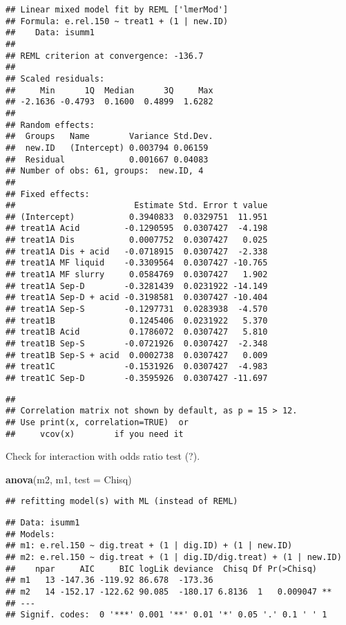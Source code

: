 \documentclass[
]{article}
\newenvironment{Shaded}{\begin{snugshade}}{\end{snugshade}}
\newcommand{\AttributeTok}[1]{\textcolor[rgb]{0.13,0.29,0.53}{#1}}
\newcommand{\FunctionTok}[1]{\textcolor[rgb]{0.13,0.29,0.53}{\textbf{#1}}}
\newcommand{\NormalTok}[1]{#1}
\newcommand{\StringTok}[1]{\textcolor[rgb]{0.31,0.60,0.02}{#1}}
\begin{document}
\begin{verbatim}
## Linear mixed model fit by REML ['lmerMod']
## Formula: e.rel.150 ~ treat1 + (1 | new.ID)
##    Data: isumm1
## 
## REML criterion at convergence: -136.7
## 
## Scaled residuals: 
##     Min      1Q  Median      3Q     Max 
## -2.1636 -0.4793  0.1600  0.4899  1.6282 
## 
## Random effects:
##  Groups   Name        Variance Std.Dev.
##  new.ID   (Intercept) 0.003794 0.06159 
##  Residual             0.001667 0.04083 
## Number of obs: 61, groups:  new.ID, 4
## 
## Fixed effects:
##                        Estimate Std. Error t value
## (Intercept)           0.3940833  0.0329751  11.951
## treat1A Acid         -0.1290595  0.0307427  -4.198
## treat1A Dis           0.0007752  0.0307427   0.025
## treat1A Dis + acid   -0.0718915  0.0307427  -2.338
## treat1A MF liquid    -0.3309564  0.0307427 -10.765
## treat1A MF slurry     0.0584769  0.0307427   1.902
## treat1A Sep-D        -0.3281439  0.0231922 -14.149
## treat1A Sep-D + acid -0.3198581  0.0307427 -10.404
## treat1A Sep-S        -0.1297731  0.0283938  -4.570
## treat1B               0.1245406  0.0231922   5.370
## treat1B Acid          0.1786072  0.0307427   5.810
## treat1B Sep-S        -0.0721926  0.0307427  -2.348
## treat1B Sep-S + acid  0.0002738  0.0307427   0.009
## treat1C              -0.1531926  0.0307427  -4.983
## treat1C Sep-D        -0.3595926  0.0307427 -11.697
\end{verbatim}

\begin{verbatim}
## 
## Correlation matrix not shown by default, as p = 15 > 12.
## Use print(x, correlation=TRUE)  or
##     vcov(x)        if you need it
\end{verbatim}

Check for interaction with odds ratio test (?).

\begin{Shaded}
\begin{Highlighting}[]
\FunctionTok{anova}\NormalTok{(m2, m1, }\AttributeTok{test =} \StringTok{\textquotesingle{}Chisq\textquotesingle{}}\NormalTok{)}
\end{Highlighting}
\end{Shaded}

\begin{verbatim}
## refitting model(s) with ML (instead of REML)
\end{verbatim}

\begin{verbatim}
## Data: isumm1
## Models:
## m1: e.rel.150 ~ dig.treat + (1 | dig.ID) + (1 | new.ID)
## m2: e.rel.150 ~ dig.treat + (1 | dig.ID/dig.treat) + (1 | new.ID)
##    npar     AIC     BIC logLik deviance  Chisq Df Pr(>Chisq)   
## m1   13 -147.36 -119.92 86.678  -173.36                        
## m2   14 -152.17 -122.62 90.085  -180.17 6.8136  1   0.009047 **
## ---
## Signif. codes:  0 '***' 0.001 '**' 0.01 '*' 0.05 '.' 0.1 ' ' 1
\end{verbatim}
\end{document}
